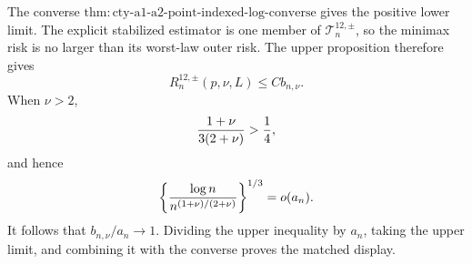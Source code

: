 The converse \(\mathrm{thm:cty\text{-}a1\text{-}a2\text{-}point\text{-}indexed\text{-}log\text{-}converse}\) gives the positive lower limit.  The explicit stabilized estimator is one member of \(\mathcal T_n^{12,\pm}\), so the minimax risk is no larger than its worst-law outer risk.  The upper proposition therefore gives
\[
 R_n^{12,\pm}(p,\nu,L)\leq Cb_{n,\nu}.
\]
When \(\nu>2\),
\[
 {1+\nu\over3(2+\nu)}>{1\over4},
\]
and hence
\[
 \left\{{\log n\over n^{(1+\nu)/(2+\nu)}}\right\}^{1/3}=o(a_n).
\]
It follows that \(b_{n,\nu}/a_n\to1\).  Dividing the upper inequality by \(a_n\), taking the upper limit, and combining it with the converse proves the matched display.